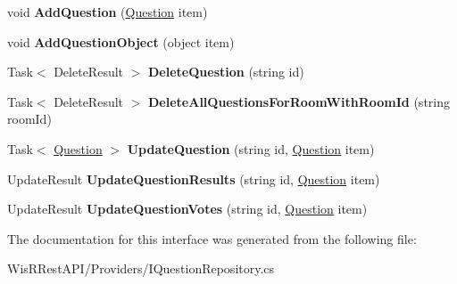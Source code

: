 \begin{DoxyCompactItemize}
\item 
\hypertarget{interface_wis_r_rest_a_p_i_1_1_domain_model_1_1_i_question_repository_a132167fe8437961b4ca5b5fcb94356d5}{}void {\bfseries Add\+Question} (\hyperlink{class_wis_r_1_1_domain_models_1_1_question}{Question} item)\label{interface_wis_r_rest_a_p_i_1_1_domain_model_1_1_i_question_repository_a132167fe8437961b4ca5b5fcb94356d5}

\item 
\hypertarget{interface_wis_r_rest_a_p_i_1_1_domain_model_1_1_i_question_repository_af294c70f00170a0d597dacbfec82411c}{}void {\bfseries Add\+Question\+Object} (object item)\label{interface_wis_r_rest_a_p_i_1_1_domain_model_1_1_i_question_repository_af294c70f00170a0d597dacbfec82411c}

\item 
\hypertarget{interface_wis_r_rest_a_p_i_1_1_domain_model_1_1_i_question_repository_a22d728d6fdd17c17062e55763e0a8950}{}Task$<$ Delete\+Result $>$ {\bfseries Delete\+Question} (string id)\label{interface_wis_r_rest_a_p_i_1_1_domain_model_1_1_i_question_repository_a22d728d6fdd17c17062e55763e0a8950}

\item 
\hypertarget{interface_wis_r_rest_a_p_i_1_1_domain_model_1_1_i_question_repository_a031a4986b12e249c9aca6d6af9ba7eb4}{}Task$<$ Delete\+Result $>$ {\bfseries Delete\+All\+Questions\+For\+Room\+With\+Room\+Id} (string room\+Id)\label{interface_wis_r_rest_a_p_i_1_1_domain_model_1_1_i_question_repository_a031a4986b12e249c9aca6d6af9ba7eb4}

\item 
\hypertarget{interface_wis_r_rest_a_p_i_1_1_domain_model_1_1_i_question_repository_ada8c1709314a20abaf365f99352e5d52}{}Task$<$ \hyperlink{class_wis_r_1_1_domain_models_1_1_question}{Question} $>$ {\bfseries Update\+Question} (string id, \hyperlink{class_wis_r_1_1_domain_models_1_1_question}{Question} item)\label{interface_wis_r_rest_a_p_i_1_1_domain_model_1_1_i_question_repository_ada8c1709314a20abaf365f99352e5d52}

\item 
\hypertarget{interface_wis_r_rest_a_p_i_1_1_domain_model_1_1_i_question_repository_af0d9d8483f2116a41b581fbcff7912a8}{}Update\+Result {\bfseries Update\+Question\+Results} (string id, \hyperlink{class_wis_r_1_1_domain_models_1_1_question}{Question} item)\label{interface_wis_r_rest_a_p_i_1_1_domain_model_1_1_i_question_repository_af0d9d8483f2116a41b581fbcff7912a8}

\item 
\hypertarget{interface_wis_r_rest_a_p_i_1_1_domain_model_1_1_i_question_repository_a4c5679dc2787ff87a3a64ab879aa8355}{}Update\+Result {\bfseries Update\+Question\+Votes} (string id, \hyperlink{class_wis_r_1_1_domain_models_1_1_question}{Question} item)\label{interface_wis_r_rest_a_p_i_1_1_domain_model_1_1_i_question_repository_a4c5679dc2787ff87a3a64ab879aa8355}

\end{DoxyCompactItemize}


The documentation for this interface was generated from the following file\+:\begin{DoxyCompactItemize}
\item 
Wis\+R\+Rest\+A\+P\+I/\+Providers/I\+Question\+Repository.\+cs\end{DoxyCompactItemize}

